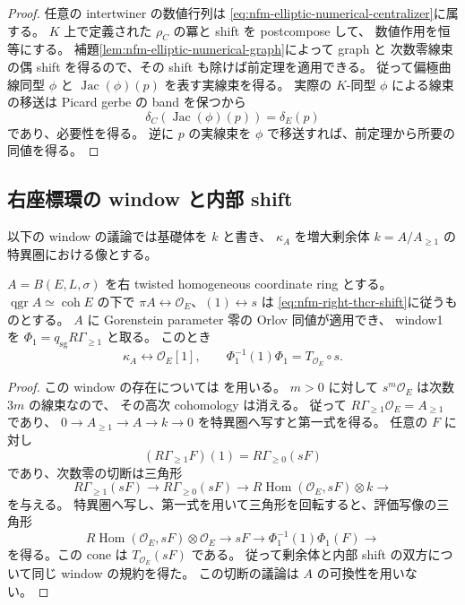 \begin{proof}
任意の intertwiner の数値行列は
\eqref{eq:nfm-elliptic-numerical-centralizer}に属する。
$K$ 上で定義された $\rho_C$ の冪と shift を postcompose して、
数値作用を恒等にする。
補題\ref{lem:nfm-elliptic-numerical-graph}によって graph と
次数零線束の偶 shift を得るので、その shift も除けば前定理を適用できる。
従って偏極曲線同型 $\phi$ と
$\operatorname{Jac}(\phi)(p)$ を表す実線束を得る。
実際の $K$-同型 $\phi$ による線束の移送は Picard gerbe の band を保つから
\[
 \delta_C(\operatorname{Jac}(\phi)(p))=\delta_E(p)
\]
であり、必要性を得る。
逆に $p$ の実線束を $\phi$ で移送すれば、前定理から所要の同値を得る。
\end{proof}

\subsection{右座標環の window と内部 shift}

以下の window の議論では基礎体を $k$ と書き、
$\kappa_A$ を増大剰余体 $k=A/A_{\ge1}$ の特異圏における像とする。

\begin{lemma}
\label{lem:nfm-twisted-elliptic-window}
$A=B(E,L,\sigma)$ を右 twisted homogeneous coordinate ring とする。
$\operatorname{qgr}A\simeq\operatorname{coh}E$ の下で
$\pi A\leftrightarrow\mathcal O_E$、$(1)\leftrightarrow s$ は
\eqref{eq:nfm-right-thcr-shift}に従うものとする。
$A$ に Gorenstein parameter 零の Orlov 同値が適用でき、
window1 を $\Phi_1=q_{\mathrm{sg}}R\Gamma_{\ge1}$ と取る。
このとき
\begin{equation}
\label{eq:nfm-twisted-active-window}
 \kappa_A\longleftrightarrow\mathcal O_E[1],\qquad
 \Phi_1^{-1}(1)\Phi_1=T_{\mathcal O_E}\circ s.
\end{equation}
\end{lemma}

\begin{proof}
この window の存在については
\cite[Theorem~2.5(iii)]{NFMOrlovSingularities}を用いる。
$m>0$ に対して $s^m\mathcal O_E$ は次数 $3m$ の線束なので、
その高次 cohomology は消える。
従って $R\Gamma_{\ge1}\mathcal O_E=A_{\ge1}$ であり、
$0\to A_{\ge1}\to A\to k\to0$ を特異圏へ写すと第一式を得る。
任意の $F$ に対し
\[
 (R\Gamma_{\ge1}F)(1)=R\Gamma_{\ge0}(sF)
\]
であり、次数零の切断は三角形
\[
 R\Gamma_{\ge1}(sF)\longrightarrow R\Gamma_{\ge0}(sF)
 \longrightarrow R\operatorname{Hom}(\mathcal O_E,sF)\otimes k
 \longrightarrow
\]
を与える。
特異圏へ写し、第一式を用いて三角形を回転すると、評価写像の三角形
\[
 R\operatorname{Hom}(\mathcal O_E,sF)\otimes\mathcal O_E
 \longrightarrow sF\longrightarrow\Phi_1^{-1}(1)\Phi_1(F)
 \longrightarrow
\]
を得る。この cone は $T_{\mathcal O_E}(sF)$ である。
従って剰余体と内部 shift の双方について同じ window の規約を得た。
この切断の議論は $A$ の可換性を用いない。
\end{proof}

